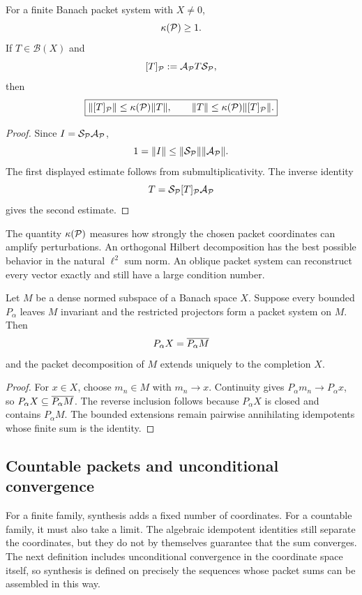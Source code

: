 \begin{proposition}
\label{prop:conditioned-coordinates}
For a finite Banach packet system with $X\ne0$,
\[
\kappa(\mathcal P)\geq1.
\]
If $T\in\mathcal B(X)$ and
\[
[T]_{\mathcal P}:=\mathcal A_{\mathcal P}T\mathcal S_{\mathcal P},
\]
then
\[
\boxed{
\|[T]_{\mathcal P}\|
\leq\kappa(\mathcal P)\|T\|,
\qquad
\|T\|
\leq\kappa(\mathcal P)\|[T]_{\mathcal P}\|.
}
\]
\end{proposition}

\begin{proof}
Since $I=\mathcal S_{\mathcal P}\mathcal A_{\mathcal P}$,
\[
1=\|I\|\leq\|\mathcal S_{\mathcal P}\|\|\mathcal A_{\mathcal P}\|.
\]
The first displayed estimate follows from submultiplicativity.  The inverse identity
\[
T=\mathcal S_{\mathcal P}[T]_{\mathcal P}\mathcal A_{\mathcal P}
\]
gives the second estimate.
\end{proof}

\begin{interpretation}
The quantity \(\kappa(\mathcal P)\) measures how strongly the chosen packet coordinates can amplify perturbations.  An orthogonal Hilbert decomposition has the best possible behavior in the natural \(\ell^2\) sum norm.  An oblique packet system can reconstruct every vector exactly and still have a large condition number.
\end{interpretation}


\begin{corollary}
\label{cor:completion-packet-split}
Let $M$ be a dense normed subspace of a Banach space $X$.  Suppose every bounded $P_\alpha$ leaves $M$ invariant and the restricted projectors form a packet system on $M$.  Then
\[
P_\alpha X=\overline{P_\alpha M}
\]
and the packet decomposition of $M$ extends uniquely to the completion $X$.
\end{corollary}

\begin{proof}
For $x\in X$, choose $m_n\in M$ with $m_n\to x$.  Continuity gives $P_\alpha m_n\to P_\alpha x$, so $P_\alpha X\subseteq\overline{P_\alpha M}$.  The reverse inclusion follows because $P_\alpha X$ is closed and contains $P_\alpha M$.  The bounded extensions remain pairwise annihilating idempotents whose finite sum is the identity.
\end{proof}

\subsection{Countable packets and unconditional convergence}
For a finite family, synthesis adds a fixed number of coordinates.  For a countable family, it must also take a limit.  The algebraic idempotent identities still separate the coordinates, but they do not by themselves guarantee that the sum converges.  The next definition includes unconditional convergence in the coordinate space itself, so synthesis is defined on precisely the sequences whose packet sums can be assembled in this way.

